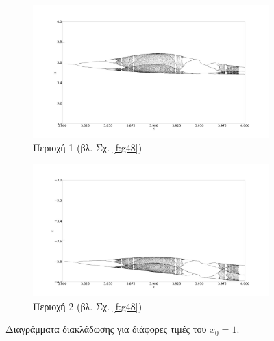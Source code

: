 \begin{figure}[ht]
	\centering
	
	\begin{subfigure}[b]{0.8\textwidth}
		\centering
		\includegraphics[width=\textwidth]{LateX images/sine q=-0.5/g12}
		\caption{Περιοχή 1 (βλ. Σχ. \ref{f:g48})}
		\label{f:g524}
	\end{subfigure}
	\hfill
	\begin{subfigure}[b]{0.8\textwidth}
		\centering
		\includegraphics[width=\textwidth]{LateX images/sine q=-0.5/g12.2}
		\caption{Περιοχή 2 (βλ. Σχ. \ref{f:g48})}
		\label{f:g525}
	\end{subfigure}
	\caption{Διαγράμματα διακλάδωσης για διάφορες τιμές του $x_0=1$. }
	\label{f:g239}
\end{figure}


